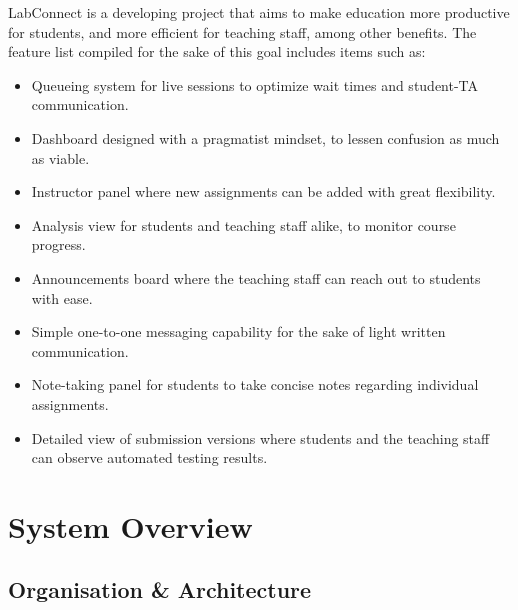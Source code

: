 \documentclass[a4paper, 12pt]{article}
\begin{document}
    
    LabConnect is a developing project that aims to make education more productive for students,
    and more efficient for teaching staff, among other benefits. The feature list compiled for the
    sake of this goal includes items such as:
    \begin{itemize}
        \item Queueing system for live sessions to optimize wait times and student-TA communication.
        \item Dashboard designed with a pragmatist mindset, to lessen confusion as much as viable.
        \item Instructor panel where new assignments can be added with great flexibility.
        \item Analysis view for students and teaching staff alike, to monitor course progress.
        \item Announcements board where the teaching staff can reach out to students with ease.
        \item Simple one-to-one messaging capability for the sake of light written communication.
        \item Note-taking panel for students to take concise notes regarding individual assignments.
        \item Detailed view of submission versions where students and the teaching staff can observe
            automated testing results.
    \end{itemize}

    \pagebreak
    
    \section{System Overview}
    
    \subsection{Organisation \& Architecture}
    
\end{document}
